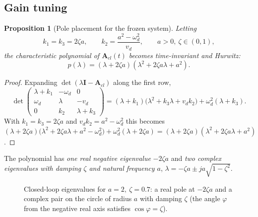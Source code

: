 \documentclass[11pt,a4paper]{article}
\newcommand{\vect}[1]{\bm{#1}}
\newcommand{\vd}{v_d}
\newcommand{\omd}{\omega_d}
\newcommand{\Acl}{\vect{A}_{cl}}
\theoremstyle{plain}
\newtheorem{proposition}[theorem]{Proposition}
\theoremstyle{definition}
\theoremstyle{remark}
\begin{document}
\subsection{Gain tuning}

\begin{proposition}[Pole placement for the frozen system]\label{prop:poles}
Letting
\[
k_1=k_3=2\zeta a,\qquad k_2=\frac{a^2-\omd^2}{\vd},\qquad a>0,\ \zeta\in(0,1),
\]
the characteristic polynomial of $\Acl(t)$ becomes time-invariant and Hurwitz:
\[
p(\lambda)=(\lambda+2\zeta a)(\lambda^2+2\zeta a\lambda+a^2).
\]
\end{proposition}
\begin{proof}
Expanding $\det(\lambda\vect I-\Acl)$ along the first row,
\[
\det\begin{pmatrix}\lambda+k_1&-\omd&0\\\omd&\lambda&-\vd\\0&k_2&\lambda+k_3\end{pmatrix}
=(\lambda+k_1)\bigl(\lambda^2+k_3\lambda+\vd k_2\bigr)+\omd^2(\lambda+k_3).
\]
With $k_1=k_3=2\zeta a$ and $\vd k_2=a^2-\omd^2$ this becomes $(\lambda+2\zeta a)\bigl(\lambda^2+2\zeta a\lambda+a^2-\omd^2\bigr)+\omd^2(\lambda+2\zeta a)=(\lambda+2\zeta a)(\lambda^2+2\zeta a\lambda+a^2)$.
\end{proof}

The polynomial has \emph{one real negative eigenvalue} $-2\zeta a$ and \emph{two complex eigenvalues with damping $\zeta$ and natural frequency $a$}, $\lambda=-\zeta a\pm ja\sqrt{1-\zeta^2}$.

\begin{figure}[H]
\centering
{}
\caption{Closed-loop eigenvalues for $a=2,\ \zeta=0.7$: a real pole at $-2\zeta a$ and a complex pair on the circle of radius $a$ with damping $\zeta$ (the angle $\varphi$ from the negative real axis satisfies $\cos\varphi=\zeta$).}
\end{figure}
\end{document}
